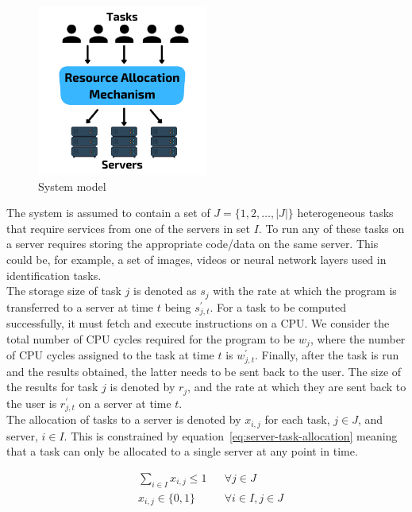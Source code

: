\begin{figure}
    \centering
    \includegraphics[width=0.5\textwidth]{figures/3_solution_figs/system_model.pdf}
    \caption{System model}
    \label{fig:system-model}
\end{figure}

The system is assumed to contain a set of $J = \{1,2,\ldots,\left| J \right|\}$ heterogeneous tasks that require
services from one of the servers in set $I$. To run any of these tasks on a server requires storing the appropriate
code/data on the same server. This could be, for example, a set of images, videos or neural network layers used in
identification tasks. \\
The storage size of task $j$ is denoted as $s_j$ with the rate at which the program is transferred to a server at time
$t$ being $s^{'}_{j,t}$. For a task to be computed successfully, it must fetch and execute instructions
on a CPU. We consider the total number of CPU cycles required for the program to be $w_j$, where the number of
CPU cycles assigned to the task at time $t$ is $w^{'}_{j,t}$. Finally, after the task is run and
the results obtained, the latter needs to be sent back to the user. The size of the results for task $j$ is denoted by
$r_j$, and the rate at which they are sent back to the user is $r^{'}_{j,t}$ on a server at time $t$. \\
The allocation of tasks to a server is denoted by $x_{i,j}$ for each task, $j \in J$, and server, $i \in I$. This is
constrained by equation~\eqref{eq:server-task-allocation} meaning that a task can only be allocated to a single server
at any point in time.

\begin{align}
    & \sum_{i \in I} x_{i,j} \leq 1 && \forall{j \in J} \label{eq:server-task-allocation} \\
    & x_{i,j} \in \{0, 1\} && \forall{i \in I, j \in J} \label{eq:server-task-binary}
\end{align}

